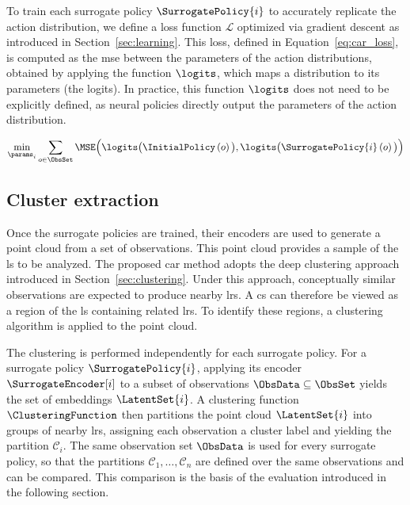 

To train each surrogate policy $\SurrogatePolicy{i}$ to accurately replicate the action distribution, we define a loss function $\mathcal{L}$ optimized via gradient descent as introduced in Section~\ref{sec:learning}.
This loss, defined in Equation~\eqref{eq:car_loss}, is computed as the \gls{mse} between the parameters of the action distributions, obtained by applying the function $\logits$, which maps a distribution to its parameters (the logits).
In practice, this function $\logits$ does not need to be explicitly defined, as neural policies directly output the parameters of the action distribution.

\begin{align}
    \min_{\params_i} \sum_{o \in \ObsSet}
    \MSE\Big(
        \logits\big(\InitialPolicy\left(o\right)\big),
        \logits\big(\SurrogatePolicy{i}\left(o\right)\big)
    \Big)
    \label{eq:car_loss}
\end{align}

\subsection{Cluster extraction}

Once the surrogate policies are trained, their encoders are used to generate a point cloud from a set of observations.
This point cloud provides a sample of the \gls{ls} to be analyzed.
The proposed \gls{car} method adopts the deep clustering approach introduced in Section~\ref{sec:clustering}.
Under this approach, conceptually similar observations are expected to produce nearby \glspl{lr}.
A \gls{cs} can therefore be viewed as a region of the \gls{ls} containing related \glspl{lr}.
To identify these regions, a clustering algorithm is applied to the point cloud.

The clustering is performed independently for each surrogate policy.
For a surrogate policy $\SurrogatePolicy{i}$, applying its encoder $\SurrogateEncoder[i]$ to a subset of observations $\ObsData \subseteq \ObsSet$ yields the set of embeddings $\LatentSet{i}$.
A clustering function $\ClusteringFunction$ then partitions the point cloud $\LatentSet{i}$ into groups of nearby \glspl{lr}, assigning each observation a cluster label and yielding the partition $\mathcal{C}_{i}$.
The same observation set $\ObsData$ is used for every surrogate policy, so that the partitions $\mathcal{C}_{1}, \dots, \mathcal{C}_{n}$ are defined over the same observations and can be compared.
This comparison is the basis of the evaluation introduced in the following section.


